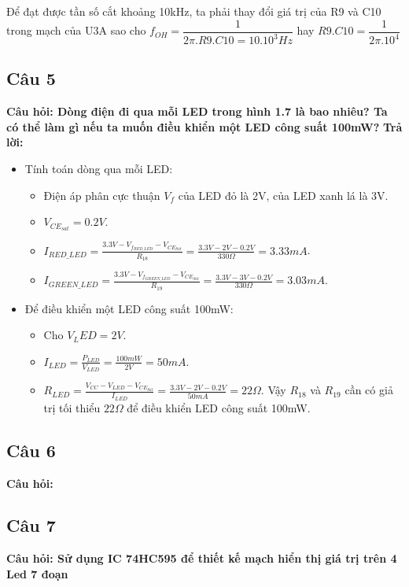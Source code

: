 Để đạt được tần số cắt khoảng 10kHz, ta phải thay đổi giá trị của R9 và C10 trong mạch của U3A sao cho $ f_{OH} = \dfrac{1}{2\pi.R9.C10 = 10.10^3 Hz}$ hay $ R9.C10 = \dfrac{1}{2\pi.10^4}$
\pagebreak
\subsection{Câu 5}
 \textbf{Câu hỏi: Dòng điện đi qua mỗi LED trong hình 1.7 là bao nhiêu? Ta có thể làm gì nếu ta muốn điều khiển một LED công suất 100mW?}
\textbf{Trả lời:}
\begin{itemize}
    \item Tính toán dòng qua mỗi LED:
    \begin{itemize}
        \item Điện áp phân cực thuận $V_f$ của LED đỏ là 2V, của LED xanh lá là 3V.
        \item $V_{CE_{sat}} = 0.2V$.
        \item $I_{RED\_LED} = \frac{3.3V - V_{f_{RED\_LED}} - V_{CE_{Sat}}}{R_{18}} = \frac{3.3V - 2V - 0.2V}{330\Omega} = 3.33mA$.
        \item $I_{GREEN\_LED} = \frac{3.3V - V_{f_{GREEN\_LED}} - V_{CE_{Sat}}}{R_{19}} = \frac{3.3V - 3V - 0.2V}{330\Omega} = 3.03mA$.
    \end{itemize}
    \item Để điều khiển một LED công suất 100mW:
    \begin{itemize}
        \item Cho $V_LED = 2V$.
        \item $I_{LED} = \frac{P_{LED}}{V_{LED}} = \frac{100mW}{2V} = 50mA$.
        \item $R_{LED} = \frac{V_{CC} - V_{LED} - V_{CE_{Sat}}}{I_{LED}} = \frac{3.3V - 2V - 0.2V}{50mA} = 22\Omega$.
        Vậy $R_{18}$ và $R_{19}$ cần có giả trị tối thiểu $22\Omega$ để điều khiển LED công suất 100mW.
    \end{itemize}
\end{itemize}
\pagebreak
\subsection{Câu 6}
\textbf{Câu hỏi: }

\pagebreak
\subsection{Câu 7}
\textbf{Câu hỏi: Sử dụng IC 74HC595 để thiết kế mạch hiển thị giá trị trên 4 Led 7 đoạn}
